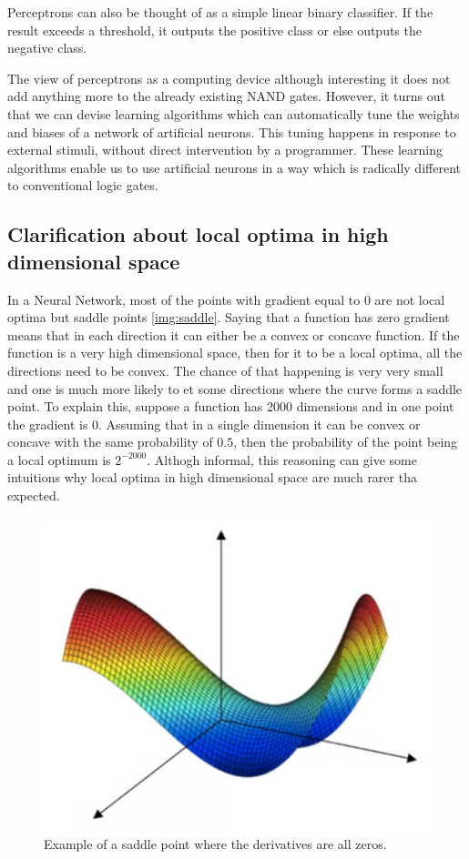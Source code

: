 Perceptrons can also be thought of as a simple linear binary classifier. If the result exceeds a threshold, it outputs the positive class or else outputs the negative class. 

The view of perceptrons as a computing device although interesting it does not add anything more to the already existing NAND gates. However, it turns out that we can devise learning algorithms which can automatically tune the weights and biases of a network of artificial neurons. This tuning happens in response to external stimuli, without direct intervention by a programmer. These learning algorithms enable us to use artificial neurons in a way which is radically different to conventional logic gates.

\subsection{Clarification about local optima in high dimensional space}
In a Neural Network, most of the points with gradient equal to $0$ are not local optima but saddle points \autoref{img:saddle}. Saying that a function has zero gradient means that in each direction it can either be a convex or concave function. If the function is a very high dimensional space, then for it to be a local optima, all the directions need to be convex. The chance of that happening is very very small and one is much more likely to et some directions where the curve forms a saddle point. To explain this, suppose a function has 2000 dimensions and in one point the gradient is $0$. Assuming that in a single dimension it can be convex or concave with the same probability of $0.5$, then the probability of the point being a local optimum is $2^{-2000}$. Althogh informal, this reasoning can give some intuitions why local optima in high dimensional space are much rarer tha expected.

\begin{figure}
\centering
\includegraphics[scale=0.6]{img/saddle}
\caption{Example of a saddle point where the derivatives are all zeros.}
\label{img:saddle}
\end{figure}


